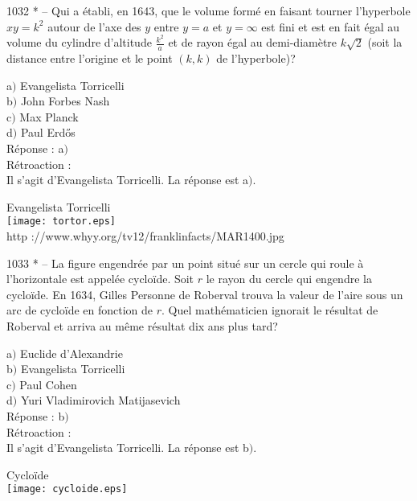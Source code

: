 ﻿\documentclass[letterpaper, 12pt]{article}
\begin{document}
1032 * -- Qui a \'etabli, en 1643, que le volume form\'e en faisant
tourner l'hyperbole $xy=k^2$ autour de l'axe des $y$ entre $y=a$ et
$y=\infty$ est fini et est en fait \'egal au volume du cylindre
d'altitude $\frac{k^2}a$ et de rayon \'egal au demi-diam\`etre
$k\sqrt2$ (soit la distance entre l'origine et le point $(k,k)$ de
l'hyperbole)?

a$)$ Evangelista Torricelli \\
b$)$ John Forbes Nash \\
c$)$ Max Planck \\
d$)$ Paul Erd\H{o}s  \\

R\'eponse : a$)$\\

R\'etroaction : \\
Il s'agit d'Evangelista Torricelli. La r\'eponse est a$)$.\\

        \begin{center}
        Evangelista Torricelli\\
    \texttt{[image: tortor.eps]}\\
        {\footnotesize http ://www.whyy.org/tv12/franklinfacts/MAR1400.jpg}
    \end{center}

1033 * -- La figure engendr\'ee par un point situ\'e sur un cercle
qui roule \`a l'horizontale est appel\'ee cyclo\"ide. Soit $r$ le
rayon du cercle qui engendre la cyclo\"ide. En 1634, Gilles Personne
de Roberval trouva la valeur de l'aire sous un arc de cyclo\"ide en
fonction de $r$. Quel math\'ematicien ignorait le r\'esultat de
Roberval et arriva au m\^eme r\'esultat dix ans plus tard?

a$)$ Euclide d'Alexandrie \\
b$)$ Evangelista Torricelli \\
c$)$ Paul Cohen \\
d$)$ Yuri Vladimirovich Matijasevich\\

R\'eponse : b$)$\\

R\'etroaction : \\
Il s'agit d'Evangelista Torricelli. La r\'eponse est b$)$.\\

        \begin{center}
Cyclo\"ide\\
    \texttt{[image: cycloide.eps]}\\
    \end{center}
\end{document}
